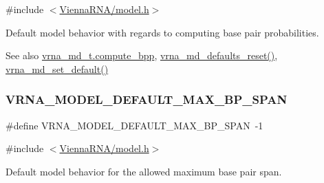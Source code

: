 {\ttfamily \#include $<$\mbox{\hyperlink{model_8h}{Vienna\+R\+N\+A/model.\+h}}$>$}



Default model behavior with regards to computing base pair probabilities. 

\begin{DoxySeeAlso}{See also}
\mbox{\hyperlink{group__model__details_aa0c3e03d9064363e27adcc92b8d0380f}{vrna\+\_\+md\+\_\+t.\+compute\+\_\+bpp}}, \mbox{\hyperlink{group__model__details_ga70834424cf804d149937de89f80ceb45}{vrna\+\_\+md\+\_\+defaults\+\_\+reset()}}, \mbox{\hyperlink{group__model__details_ga8ac6ff84936282436f822644bf841f66}{vrna\+\_\+md\+\_\+set\+\_\+default()}} 
\end{DoxySeeAlso}
\mbox{\label{group__model__details_ga7cb6f4ae8fdebff6746a4410814f2977}} 
\subsubsection{\texorpdfstring{V\+R\+N\+A\+\_\+\+M\+O\+D\+E\+L\+\_\+\+D\+E\+F\+A\+U\+L\+T\+\_\+\+M\+A\+X\+\_\+\+B\+P\+\_\+\+S\+P\+AN}{VRNA\_MODEL\_DEFAULT\_MAX\_BP\_SPAN}}
{\footnotesize\ttfamily \#define V\+R\+N\+A\+\_\+\+M\+O\+D\+E\+L\+\_\+\+D\+E\+F\+A\+U\+L\+T\+\_\+\+M\+A\+X\+\_\+\+B\+P\+\_\+\+S\+P\+AN~-\/1}



{\ttfamily \#include $<$\mbox{\hyperlink{model_8h}{Vienna\+R\+N\+A/model.\+h}}$>$}



Default model behavior for the allowed maximum base pair span. 

